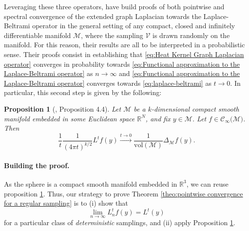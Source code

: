 \documentclass{article} %
\newtheorem{definition}{Definition}[section]
\newtheorem{prop}{Proposition}
\newcommand{\V}{\mathcal{V}}  %
\begin{document}
Leveraging these three operators, \citet{belkin2005towards, belkin2007convergence} have build proofs of both pointwise and spectral convergence of the extended graph Laplacian towards the Laplace-Beltrami operator in the general setting of any compact, closed and infinitely differentiable manifold $\mathcal M$, where the sampling $\V$ is drawn randomly on the manifold. For this reason, their results are all to be interpreted in a probabilistic sense.
Their proofs consist in establishing that \eqref{eq:Heat Kernel Graph Laplacian operator} converges in probability towards \eqref{eq:Functional approximation to the Laplace-Beltrami operator} as $n\rightarrow \infty$ and \eqref{eq:Functional approximation to the Laplace-Beltrami operator} converges towards \eqref{eq:laplace-beltrami} as $t\rightarrow 0$. In particular, this second step is given by the following:
\begin{prop}
[\citet{belkin2005towards}, Proposition 4.4]
Let $\mathcal{M}$ be a $k$-dimensional compact smooth manifold embedded in some Euclidean space $\mathbb{R}^N$, and fix $y\in\mathcal{M}$. Let $f\in\mathcal{C}_\infty(\mathcal{M)}$. Then
\begin{equation}
\frac{1}{t}\frac{1}{(4\pi t)^{k/2}} L^tf(y) \xrightarrow{t\to 0 } \frac{1}{\text{vol}(\mathcal M)}\Delta_{\mathcal M}f(y).
\end{equation}
\label{prop:3}
\end{prop}

\paragraph{Building the proof.}
As the sphere is a compact smooth manifold embedded in $\mathbb{R}^3$, we can reuse proposition \ref{prop:3}. Thus, our strategy to prove Theorem \ref{theo:pointwise convergence for a regular sampling} is to (i) show that
\begin{equation}\label{eq:continuous convergence}
	\lim_{n\to\infty}L_n^{t} f(y) =  L^t(y)
\end{equation}
for a particular class of \emph{deterministic} samplings, and (ii) apply Proposition \ref{prop:3}.

\end{document}
